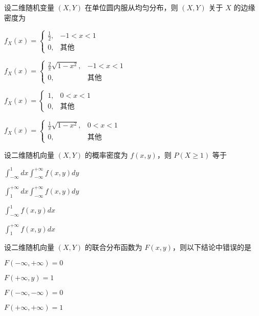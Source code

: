 \documentclass{exam-zh}
\begin{document}
\begin{question}
  设二维随机变量 $(X, Y)$ 在单位圆内服从均匀分布，则 $(X, Y)$ 关于 $X$ 的边缘密度为 \paren[B]
  \begin{choices}
    \item 
    $f_X(x) = 
    \begin{cases} 
    \frac{1}{2}, & -1 < x < 1 \\ 
    0, & \text{其他}
    \end{cases}$
    
    \item 
    $f_X(x) =
    \begin{cases} 
    \frac{2}{\pi} \sqrt{1-x^2}, & -1 < x < 1 \\ 
    0, & \text{其他}
    \end{cases}$
    
    \item 
    $f_X(x) =
    \begin{cases} 
    1, & 0 < x < 1 \\ 
    0, & \text{其他}
    \end{cases}$
    
    \item 
    $f_X(x) =
    \begin{cases} 
    \frac{1}{\pi} \sqrt{1-x^2}, & 0 < x < 1 \\ 
    0, & \text{其他}
    \end{cases}$
  \end{choices}
\end{question}

\begin{question}
  设二维随机向量 $(X, Y)$ 的概率密度为 $f(x, y)$，则  
  $P(X \geq 1)$ 等于 \paren[B]
  \begin{choices}
    \item 
    $\int_{-\infty}^{1} dx \int_{-\infty}^{+\infty} f(x, y) dy$  
    
    \item 
    $\int_{1}^{+\infty} dx \int_{-\infty}^{+\infty} f(x, y) dy$  
    
    \item 
    $\int_{-\infty}^{1} f(x, y) dx$  
    
    \item 
    $\int_{1}^{+\infty} f(x, y) dx$  
  \end{choices}
\end{question}

\begin{question}
  设二维随机向量 $(X, Y)$ 的联合分布函数为 $F(x, y)$，则以下结论中错误的是 \paren[B]
  \begin{choices}
    \item $F(-\infty, +\infty) = 0$  
    \item $F(+\infty, y) = 1$  
    \item $F(-\infty, -\infty) = 0$  
    \item $F(+\infty, +\infty) = 1$  
  \end{choices}
\end{question}
\end{document}
